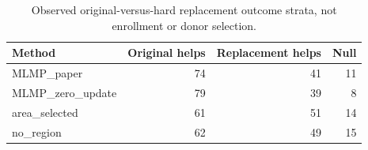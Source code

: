\begin{table}[htbp]
\centering\scriptsize
\caption{Observed original-versus-hard replacement outcome strata, not enrollment or donor selection.}
\label{tab:context-benefit}
\setlength{\tabcolsep}{4pt}
\begin{tabular}{lrrr}
\toprule
Method & Original helps & Replacement helps & Null \\
\midrule
MLMP\_paper & 74 & 41 & 11 \\
MLMP\_zero\_update & 79 & 39 & 8 \\
area\_selected & 61 & 51 & 14 \\
no\_region & 62 & 49 & 15 \\
\bottomrule
\end{tabular}
\end{table}
